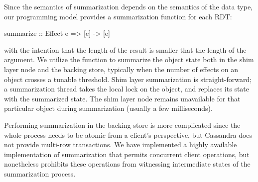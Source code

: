 \noindent Since the semantics of summarization depends on the semantics of the data
type, our programming model provides a summarization function for each RDT:
\begin{codehaskell}
summarize :: Effect e => [e] -> [e]
\end{codehaskell}
\noindent with the intention that the length of the result is smaller that the
length of the argument. We utilize the  function to summarize the
object state both in the shim layer node and the backing store, typically when
the number of effects on an object crosses a tunable threshold. Shim layer
summarization is straight-forward; a summarization thread takes the local lock
on the object, and replaces its state with the summarized state. The shim layer
node remains unavailable for that particular object during summarization
(usually a few milliseconds).

Performing summarization in the backing store is more complicated since the whole
process needs to be atomic from a client's perspective, but Cassandra does not
provide multi-row transactions. We have implemented a highly available
implementation of summarization that permits concurrent client operations, but
nonetheless prohibits these operations from witnessing intermediate states of
the summarization process.
